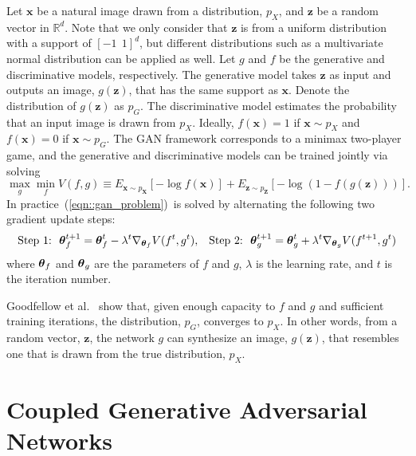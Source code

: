 \documentclass{article}
\begin{document}
Let $\mathbf{x}$ be a natural image drawn from a distribution, $p_{X}$, and $\mathbf{z}$ be a random vector in $\mathbb{R}^d$. Note that we only consider that $\mathbf{z}$ is from a uniform distribution with a support of $[-1\medspace\medspace 1]^d$, but different distributions such as a multivariate normal distribution can be applied as well. Let $g$ and $f$ be the generative and discriminative models, respectively. The generative model takes $\mathbf{z}$ as input and outputs an image, $g(\mathbf{z})$, that has the same support as $\mathbf{x}$. Denote the distribution of $g(\mathbf{z})$ as $p_{G}$. The discriminative model estimates the probability that an input image is drawn from $p_{X}$. Ideally, $f(\mathbf{x})=1$ if $\mathbf{x}\sim p_{X}$ and $f(\mathbf{x})=0$ if $\mathbf{x}\sim p_{G}$. The GAN framework corresponds to a minimax two-player game, and the generative and discriminative models can be trained jointly via solving 
\begin{equation}
\max_{g} \min_{f} V(f,g) \equiv E_{ \mathbf{x} \sim p_{\mathbf{X}}} [ - \log f(\mathbf{x}) ] + E_{\mathbf{z}\sim p_{\mathbf{Z}}} [ - \log( 1 - f(g(\mathbf{z}))) ].
 \label{eqn::gan_problem}
\end{equation}
In practice~(\ref{eqn::gan_problem})~is solved by alternating the following two gradient update steps:
\begin{align}
&\text{Step 1: }\medspace  \text{\boldmath$\theta$}_f^{t+1} = \text{\boldmath$\theta$}_f^{t} - \lambda^t\nabla_{\text{\boldmath$\theta$}_f} V(f^{t},g^{t}),
&\text{Step 2: }\medspace  \text{\boldmath$\theta$}_g^{t+1} = \text{\boldmath$\theta$}_g^{t} + \lambda^t\nabla_{\text{\boldmath$\theta$}_g} V(f^{t+1},g^{t})\nonumber
\end{align}
where $\text{\boldmath$\theta$}_f$ and $\text{\boldmath$\theta$}_g$ are the parameters of $f$ and $g$, $\lambda$ is the learning rate, and $t$ is the iteration number. 

Goodfellow et al.~\cite{goodfellow2014generative} show that, given enough capacity to $f$ and $g$ and sufficient training iterations, the distribution, $p_{G}$, converges to $p_{X}$. In other words, from a random vector, $\mathbf{z}$, the network $g$ can synthesize an image, $g(\mathbf{z})$, that resembles one that is drawn from the true distribution, $p_X$.

\section{Coupled Generative Adversarial Networks}\label{sec::dgan}
\end{document}
